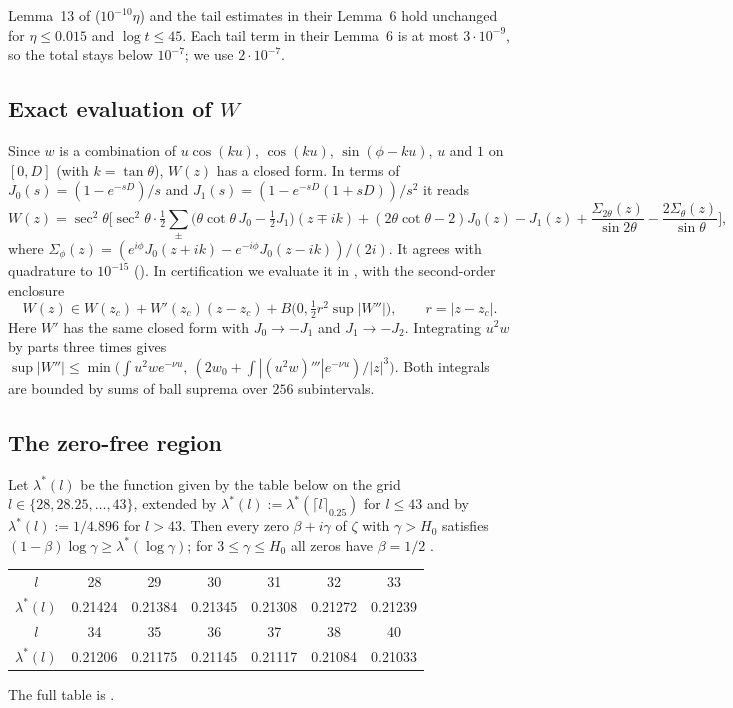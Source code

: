Lemma~13 of \cite{BTY} ($10^{-10}\eta$) and the tail estimates in their Lemma~6 hold unchanged for $\eta \le 0.015$ and $\log t \le 45$.
Each tail term in their Lemma~6 is at most $3\cdot 10^{-9}$, so the total stays below $10^{-7}$; we use $2\cdot10^{-7}$.

\subsection{Exact evaluation of $W$}
Since $w$ is a combination of $u\cos(ku)$, $\cos(ku)$, $\sin(\phi-ku)$, $u$ and $1$ on $[0,D]$ (with $k = \tan\theta$), $W(z)$ has a closed form.
In terms of $J_0(s) = (1-e^{-sD})/s$ and $J_1(s) = (1 - e^{-sD}(1+sD))/s^2$ it reads
\[
W(z) = \sec^2\theta\Big[\sec^2\theta\cdot\tfrac12\sum_\pm\big(\theta\cot\theta\, J_0 - \tfrac12J_1\big)(z\mp ik) + (2\theta\cot\theta-2)J_0(z) - J_1(z) + \frac{\Sigma_{2\theta}(z)}{\sin2\theta} - \frac{2\Sigma_\theta(z)}{\sin\theta}\Big],
\]
where $\Sigma_\phi(z) = (e^{i\phi}J_0(z+ik) - e^{-i\phi}J_0(z-ik))/(2i)$.
It agrees with quadrature to $10^{-15}$ ().
In certification we evaluate it in , with the second-order enclosure
\[
W(z) \in W(z_c) + W'(z_c)(z - z_c) + B\big(0, \tfrac12 r^2\sup|W''|\big), \qquad r = |z-z_c| .
\]
Here $W'$ has the same closed form with $J_0\to-J_1$ and $J_1\to-J_2$.
Integrating $u^2w$ by parts three times gives $\sup|W''| \le \min\big(\int u^2we^{-\nu u},\ (2w_0 + \int|(u^2w)'''|e^{-\nu u})/|z|^3\big)$.
Both integrals are bounded by sums of ball suprema over $256$ subintervals.

\subsection{The zero-free region}
\begin{theorem}\label{thm:H}
Let $\lambda^*(l)$ be the function given by the table below on the grid $l \in \{28, 28.25, \dots, 43\}$, extended by $\lambda^*(l) := \lambda^*(\lceil l\rceil_{0.25})$ for $l \le 43$ and by $\lambda^*(l) := 1/4.896$ for $l > 43$.
Then every zero $\beta+i\gamma$ of $\zeta$ with $\gamma > H_0$ satisfies $(1-\beta)\log\gamma \ge \lambda^*(\log\gamma)$; for $3\le\gamma\le H_0$ all zeros have $\beta = 1/2$ \cite{PlattTrudgianRH}.
\begin{center}\small
\begin{tabular}{c|cccccc}
\toprule
$l$ & 28 & 29 & 30 & 31 & 32 & 33\\
$\lambda^*(l)$ & 0.21424 & 0.21384 & 0.21345 & 0.21308 & 0.21272 & 0.21239\\
\midrule
$l$ & 34 & 35 & 36 & 37 & 38 & 40\\
$\lambda^*(l)$ & 0.21206 & 0.21175 & 0.21145 & 0.21117 & 0.21084 & 0.21033\\
\bottomrule
\end{tabular}
\end{center}
The full table is .
\end{theorem}

